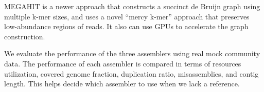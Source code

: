 \documentclass[10pt,a4paper,twocolumn]{article}
\begin{document}
MEGAHIT \cite{megahit} is a newer approach that constructs a succinct
de Bruijn graph using multiple k-mer sizes, and uses a novel ``mercy
k-mer'' approach that preserves low-abundance regions of reads. It also
can use GPUs to accelerate the graph construction.

We evaluate the performance of the three assemblers using real mock
community data. The performance of each assembler is compared in terms
of resources utilization, covered genome fraction, duplication ratio,
misassemblies, and contig length. This helps decide which assembler to
use when we lack a reference.





 
\end{document}
